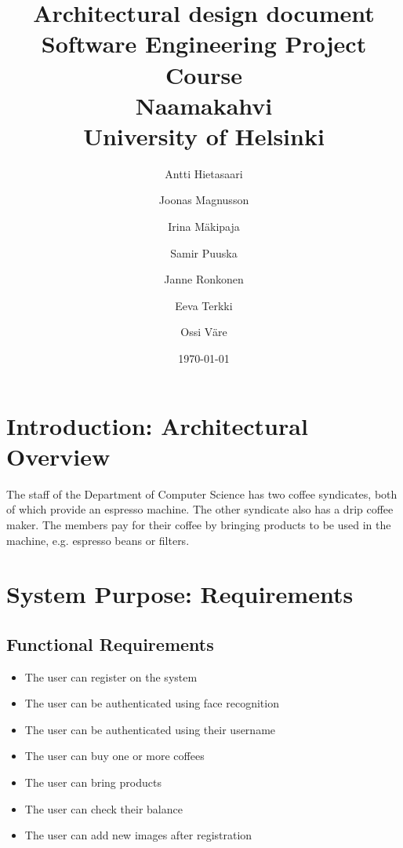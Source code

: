\documentclass[11pt]{article}
\title{Architectural design document\\
  Software Engineering Project Course\\
  Naamakahvi\\
  University of Helsinki}
\author{Antti Hietasaari
  \and Joonas Magnusson
  \and Irina Mäkipaja
  \and Samir Puuska
  \and Janne Ronkonen
  \and Eeva Terkki
  \and Ossi Väre}
\date{\today}
\begin{document}
\maketitle

\tableofcontents



\section{Introduction: Architectural Overview}

The staff of the Department of Computer Science has two coffee syndicates, both of which provide an espresso machine. The other syndicate also has a drip coffee maker. The members pay for their coffee by bringing products to be used in the machine, e.g. espresso beans or filters.

\section{System Purpose: Requirements}


\subsection{Functional Requirements}

\begin{itemize}
\item{The user can register on the system}
\item{The user can be authenticated using face recognition}
\item{The user can be authenticated using their username}  
\item{The user can buy one or more coffees}
\item{The user can bring products}
\item{The user can check their balance}
\item{The user can add new images after registration}
\end{itemize}  
\end{document}
